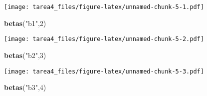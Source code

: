 \documentclass[]{article}
\newenvironment{Shaded}{\begin{snugshade}}{\end{snugshade}}
\newcommand{\KeywordTok}[1]{\textcolor[rgb]{0.13,0.29,0.53}{\textbf{#1}}}
\newcommand{\DataTypeTok}[1]{\textcolor[rgb]{0.13,0.29,0.53}{#1}}
\newcommand{\DecValTok}[1]{\textcolor[rgb]{0.00,0.00,0.81}{#1}}
\newcommand{\StringTok}[1]{\textcolor[rgb]{0.31,0.60,0.02}{#1}}
\newcommand{\CommentTok}[1]{\textcolor[rgb]{0.56,0.35,0.01}{\textit{#1}}}
\newcommand{\OtherTok}[1]{\textcolor[rgb]{0.56,0.35,0.01}{#1}}
\newcommand{\ControlFlowTok}[1]{\textcolor[rgb]{0.13,0.29,0.53}{\textbf{#1}}}
\newcommand{\OperatorTok}[1]{\textcolor[rgb]{0.81,0.36,0.00}{\textbf{#1}}}
\newcommand{\NormalTok}[1]{#1}
\begin{document}
\begin{Shaded}
\end{Shaded}

\texttt{[image: tarea4\_files/figure-latex/unnamed-chunk-5-1.pdf]}

\begin{Shaded}
\begin{Highlighting}[]
\KeywordTok{betas}\NormalTok{(}\StringTok{"b1"}\NormalTok{,}\DecValTok{2}\NormalTok{)}
\end{Highlighting}
\end{Shaded}

\texttt{[image: tarea4\_files/figure-latex/unnamed-chunk-5-2.pdf]}

\begin{Shaded}
\begin{Highlighting}[]
\KeywordTok{betas}\NormalTok{(}\StringTok{"b2"}\NormalTok{,}\DecValTok{3}\NormalTok{)}
\end{Highlighting}
\end{Shaded}

\texttt{[image: tarea4\_files/figure-latex/unnamed-chunk-5-3.pdf]}

\begin{Shaded}
\begin{Highlighting}[]
\KeywordTok{betas}\NormalTok{(}\StringTok{"b3"}\NormalTok{,}\DecValTok{4}\NormalTok{)}
\end{Highlighting}
\end{Shaded}
\end{document}
